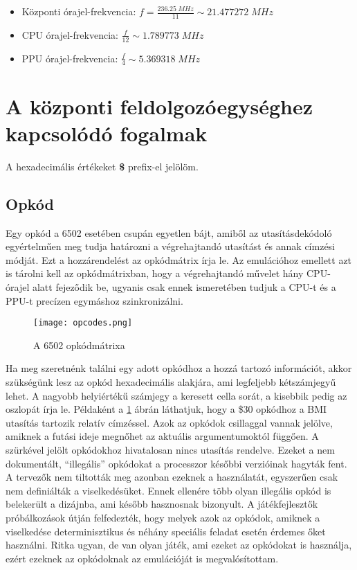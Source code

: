\begin{itemize}
	\item Központi órajel-frekvencia: $ f = \frac{236.25\;MHz}{11} \sim 21.477272\; MHz $
	\item CPU órajel-frekvencia: $ \frac{f}{12} \sim 1.789773 \; MHz  $
	\item PPU órajel-frekvencia: $ \frac{f}{4}  \sim 5.369318 \; MHz $
\end{itemize}

\section{A központi feldolgozóegységhez kapcsolódó fogalmak}

\begin{note}
	A hexadecimális értékeket \textbf{\$} prefix-el jelölöm.
\end{note}

\subsection{Opkód \cite{6502desc} \cite{6502opc}}
Egy opkód a 6502 esetében csupán egyetlen bájt, amiből az utasításdekódoló egyértelműen meg tudja határozni a végrehajtandó utasítást és annak címzési módját.
Ezt a hozzárendelést az opkódmátrix írja le. Az emulációhoz emellett azt is tárolni kell az opkódmátrixban, hogy a végrehajtandó művelet hány CPU-órajel alatt fejeződik be, ugyanis csak ennek ismeretében tudjuk a CPU-t és a PPU-t precízen egymáshoz szinkronizálni.

\begin{figure}[H]
	\centering
	\texttt{[image: opcodes.png]}
	\caption{A 6502 opkódmátrixa}
	\label{fig:opcodes}
\end{figure}

Ha meg szeretnénk találni egy adott opkódhoz a hozzá tartozó információt, akkor szükségünk lesz az opkód hexadecimális alakjára, ami legfeljebb kétszámjegyű lehet. A nagyobb helyiértékű számjegy a keresett cella sorát, a kisebbik pedig az oszlopát írja le. Példaként a \ref{fig:opcodes} ábrán láthatjuk, hogy a \$30 opkódhoz a BMI utasítás tartozik relatív címzéssel.
Azok az opkódok csillaggal vannak jelölve, amiknek a futási ideje megnőhet az aktuális argumentumoktól függően.
A szürkével jelölt opkódokhoz hivatalosan nincs utasítás rendelve. 
Ezeket a nem dokumentált, ``illegális'' opkódokat a processzor későbbi 
verzióinak hagyták fent. \cite{illegal} A tervezők nem tiltották meg azonban ezeknek a használatát, 
egyszerűen csak nem definiálták a viselkedésüket. Ennek ellenére több olyan illegális opkód is belekerült a dizájnba, ami később hasznosnak bizonyult. A játékfejlesztők próbálkozások útján
felfedezték, hogy melyek azok az opkódok, amiknek a viselkedése determinisztikus és néhány speciális feladat esetén érdemes őket használni.
Ritka ugyan, de van olyan játék, ami ezeket az opkódokat is használja, ezért ezeknek az opkódoknak az emulációját is megvalósítottam.

